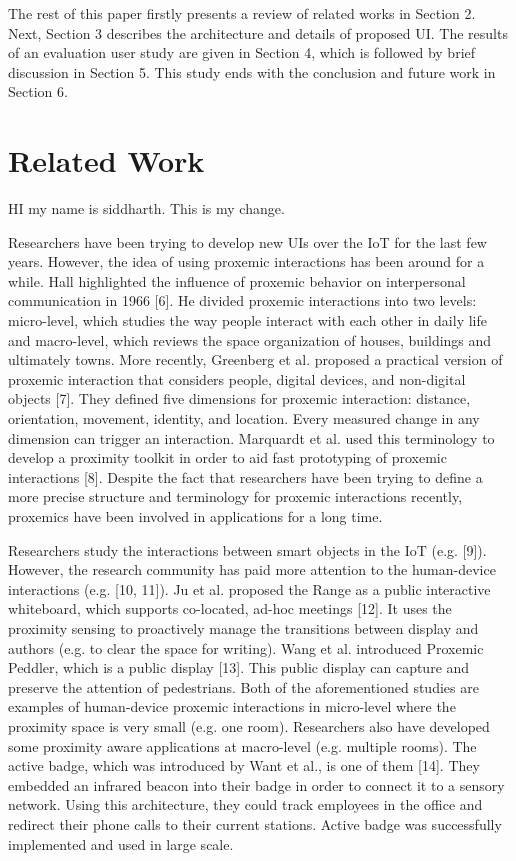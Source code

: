 \documentclass[]{IEEEphot}
\begin{document}
The rest of this paper firstly presents a review of related works in Section
2. Next, Section 3 describes the architecture and details of proposed UI. The
results of an evaluation user study are given in Section 4, which is followed by
brief discussion in Section 5. This study ends with the conclusion and future
work in Section 6.


\section{ Related Work}
HI my name is siddharth. This is my change.



Researchers have been trying to develop new UIs over the IoT for the last few
years. However, the idea of using proxemic interactions has been around for
a while. Hall highlighted the influence of proxemic behavior on interpersonal
communication in 1966 [6]. He divided proxemic interactions into two levels:
micro-level, which studies the way people interact with each other in daily life
and macro-level, which reviews the space organization of houses, buildings and
ultimately towns. More recently, Greenberg et al. proposed a practical version
of proxemic interaction that considers people, digital devices, and non-digital
objects [7]. They defined five dimensions for proxemic interaction: distance, orientation, movement, identity, and location. Every measured change in any dimension can trigger an interaction. Marquardt et al. used this terminology to
develop a proximity toolkit in order to aid fast prototyping of proxemic interactions [8]. Despite the fact that researchers have been trying to define a more
precise structure and terminology for proxemic interactions recently, proxemics
have been involved in applications for a long time.



Researchers study the interactions between smart objects in the IoT (e.g. [9]).
However, the research community has paid more attention to the human-device interactions (e.g. [10, 11]). Ju et al. proposed the Range as a public interactive
whiteboard, which supports co-located, ad-hoc meetings [12]. It uses the proximity sensing to proactively manage the transitions between display and authors
(e.g. to clear the space for writing). Wang et al. introduced Proxemic Peddler,
which is a public display [13]. This public display can capture and preserve the
attention of pedestrians. Both of the aforementioned studies are examples of
human-device proxemic interactions in micro-level where the proximity space
is very small (e.g. one room). Researchers also have developed some proximity
aware applications at macro-level (e.g. multiple rooms). The active badge, which
was introduced by Want et al., is one of them [14]. They embedded an infrared
beacon into their badge in order to connect it to a sensory network. Using this
architecture, they could track employees in the office and redirect their phone
calls to their current stations. Active badge was successfully implemented and
used in large scale.
\end{document}
